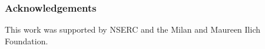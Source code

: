 \subsubsection*{Acknowledgements}
\label{sec:achnowledge}
This work was supported by NSERC and the Milan and Maureen Ilich Foundation.

